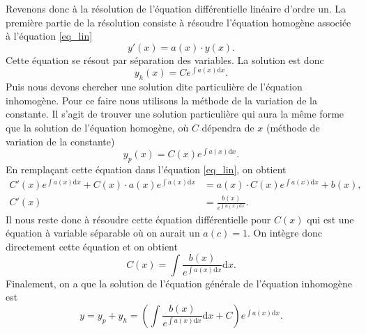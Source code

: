 \documentclass[a4paper,12pt]{book}
\newcommand{\dd}{\mathrm{d}}
\begin{document}
Revenons donc à la résolution de l'équation différentielle linéaire d'ordre un. 
La première partie de la résolution consiste à résoudre 
l'équation homogène associée à l'équation \eqref{eq_lin}
\begin{equation}
 y'(x)=a(x)\cdot y(x).
 \end{equation}
Cette équation se résout par séparation des variables. La solution est donc
\begin{equation}
 y_h(x)=Ce^{\int a(x)\dd x}.
\end{equation}
Puis nous devons chercher une solution dite particulière de l'équation inhomogène.
Pour ce faire nous utilisons la méthode de la variation de la constante. Il s'agit de trouver une solution 
particulière qui aura la même forme que la solution de l'équation homogène, où $C$ dépendra de $x$ (méthode de variation de la constante)
\begin{equation}
 y_p(x)=C(x)e^{\int a(x)\dd x}.
\end{equation}
En remplaçant cette équation dans l'équation \eqref{eq_lin}, on obtient
\begin{align}
 C'(x)e^{\int a(x)\dd x}+C(x)\cdot a(x)e^{\int a(x)\dd x}&=a(x)\cdot C(x) e^{\int a(x)\dd x}+b(x),\nonumber\\
 C'(x)&=\frac{b(x)}{e^{\int a(x)\dd x}}.
 \end{align}
Il nous reste donc à résoudre cette équation différentielle pour $C(x)$ qui est une équation à variable séparable où 
on aurait un $a(c)=1$. On intègre donc directement cette équation et on obtient
\begin{equation}
 C(x)=\int \frac{b(x)}{e^{\int a(x)\dd x}}\dd x.
\end{equation}
Finalement, on a que la solution de l'équation générale de l'équation inhomogène est
\begin{equation}
 y=y_p+y_h=\left(\int \frac{b(x)}{e^{\int a(x)\dd x}}\dd x+C\right)e^{\int a(x)\dd x}.
\end{equation}
\end{document}

